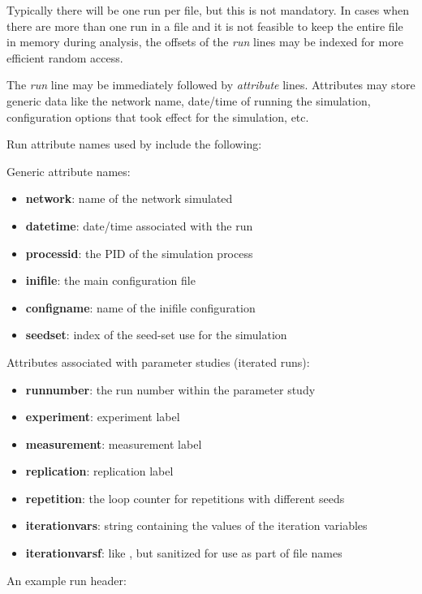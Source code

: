 Typically there will be one run per file, but this is not mandatory.
In cases when there are more than one run in a file and it is not feasible
to keep the entire file in memory during analysis, the offsets of the \textit{run}
lines may be indexed for more efficient random access.

The \textit{run} line may be immediately followed by \textit{attribute} lines.
Attributes may store generic data like the network name, date/time of running
the simulation, configuration options that took effect for the simulation, etc.

Run attribute names used by {\opp} include the following:

Generic attribute names:

\begin{itemize}
    \item \textbf{network}: name of the network simulated
    \item \textbf{datetime}: date/time associated with the run
    \item \textbf{processid}: the PID of the simulation process
    \item \textbf{inifile}: the main configuration file
    \item \textbf{configname}: name of the inifile configuration
    \item \textbf{seedset}: index of the seed-set use for the simulation
\end{itemize}

Attributes associated with parameter studies (iterated runs):

\begin{itemize}
    \item \textbf{runnumber}: the run number within the parameter study
    \item \textbf{experiment}: experiment label
    \item \textbf{measurement}: measurement label
    \item \textbf{replication}: replication label
    \item \textbf{repetition}: the loop counter for repetitions with different seeds
    \item \textbf{iterationvars}: string containing the values of the iteration variables
    \item \textbf{iterationvarsf}: like , but sanitized for use as part of file names
\end{itemize}


An example run header:

